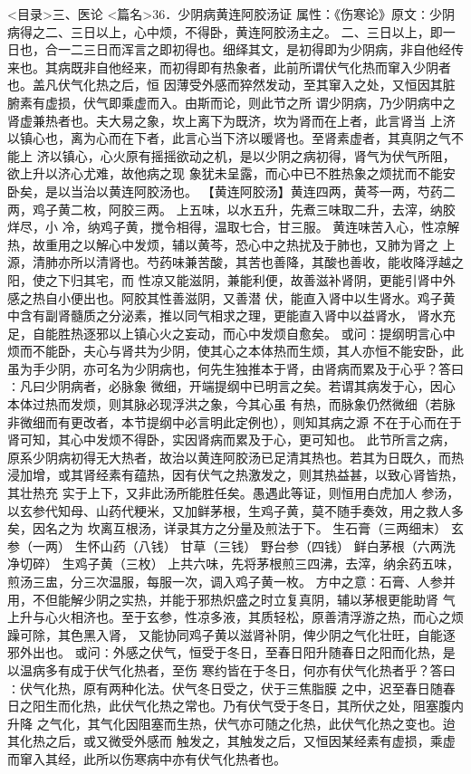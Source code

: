 \documentclass[a4paper,12pt,UTF8,twoside]{ctexbook}
\begin{document}
<目录>三、医论
<篇名>36．少阴病黄连阿胶汤证
属性：《伤寒论》原文∶少阴病得之二、三日以上，心中烦，不得卧，黄连阿胶汤主之。 
二、三日以上，即一日也，合一二三日而浑言之即初得也。细绎其文，是初得即为少阴病，非自他经传 
来也。其病既非自他经来，而初得即有热象者，此前所谓伏气化热而窜入少阴者也。盖凡伏气化热之后，恒 
因薄受外感而猝然发动，至其窜入之处，又恒因其脏腑素有虚损，伏气即乘虚而入。由斯而论，则此节之所 
谓少阴病，乃少阴病中之肾虚兼热者也。夫大易之象，坎上离下为既济，坎为肾而在上者，此言肾当 
上济以镇心也，离为心而在下者，此言心当下济以暖肾也。至肾素虚者，其真阴之气不能上 
济以镇心，心火原有摇摇欲动之机，是以少阴之病初得，肾气为伏气所阻，欲上升以济心尤难，故他病之现 
象犹未呈露，而心中已不胜热象之烦扰而不能安卧矣，是以当治以黄连阿胶汤也。 
【黄连阿胶汤】黄连四两，黄芩一两，芍药二两，鸡子黄二枚，阿胶三两。 
上五味，以水五升，先煮三味取二升，去滓，纳胶烊尽，小 
冷，纳鸡子黄，搅令相得，温取七合，甘三服。 
黄连味苦入心，性凉解热，故重用之以解心中发烦，辅以黄芩，恐心中之热扰及于肺也，又肺为肾之 
上源，清肺亦所以清肾也。芍药味兼苦酸，其苦也善降，其酸也善收，能收降浮越之阳，使之下归其宅，而 
性凉又能滋阴，兼能利便，故善滋补肾阴，更能引肾中外感之热自小便出也。阿胶其性善滋阴，又善潜 
伏，能直入肾中以生肾水。鸡子黄中含有副肾髓质之分泌素，推以同气相求之理，更能直入肾中以益肾水， 
肾水充足，自能胜热逐邪以上镇心火之妄动，而心中发烦自愈矣。 
或问∶提纲明言心中烦而不能卧，夫心与肾共为少阴，使其心之本体热而生烦，其人亦恒不能安卧，此 
虽为手少阴，亦可名为少阴病也，何先生独推本于肾，由肾病而累及于心乎？答曰∶凡曰少阴病者，必脉象 
微细，开端提纲中已明言之矣。若谓其病发于心，因心本体过热而发烦，则其脉必现浮洪之象，今其心虽 
有热，而脉象仍然微细（若脉非微细而有更改者，本节提纲中必言明此定例也），则知其病之源 
不在于心而在于肾可知，其心中发烦不得卧，实因肾病而累及于心，更可知也。 
此节所言之病，原系少阴病初得无大热者，故治以黄连阿胶汤已足清其热也。若其为日既久，而热 
浸加增，或其肾经素有蕴热，因有伏气之热激发之，则其热益甚，以致心肾皆热，其壮热充 
实于上下，又非此汤所能胜任矣。愚遇此等证，则恒用白虎加人 
参汤，以玄参代知母、山药代粳米，又加鲜茅根，生鸡子黄，莫不随手奏效，用之救人多矣，因名之为 
坎离互根汤，详录其方之分量及煎法于下。 
生石膏（三两细末） 玄参（一两） 生怀山药（八钱） 甘草（三钱） 
野台参（四钱） 鲜白茅根（六两洗净切碎） 生鸡子黄（三枚） 
上共六味，先将茅根煎三四沸，去滓，纳余药五味，煎汤三盅，分三次温服，每服一次，调入鸡子黄一枚。 
方中之意∶石膏、人参并用，不但能解少阴之实热，并能于邪热炽盛之时立复真阴，辅以茅根更能助肾 
气上升与心火相济也。至于玄参，性凉多液，其质轻松，原善清浮游之热，而心之烦躁可除，其色黑入肾， 
又能协同鸡子黄以滋肾补阴，俾少阴之气化壮旺，自能逐邪外出也。 
或问∶外感之伏气，恒受于冬日，至春日阳升随春日之阳而化热，是以温病多有成于伏气化热者，至伤 
寒约皆在于冬日，何亦有伏气化热者乎？答曰∶伏气化热，原有两种化法。伏气冬日受之，伏于三焦脂膜 
之中，迟至春日随春日之阳生而化热，此伏气化热之常也。乃有伏气受于冬日，其所伏之处，阻塞腹内升降 
之气化，其气化因阻塞而生热，伏气亦可随之化热，此伏气化热之变也。迨其化热之后，或又微受外感而 
触发之，其触发之后，又恒因某经素有虚损，乘虚而窜入其经，此所以伤寒病中亦有伏气化热者也。 
\end{document}
